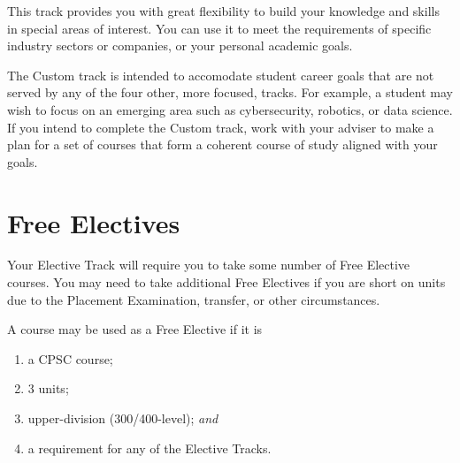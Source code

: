 \documentclass{book}
\begin{document}
This track provides you with great flexibility to build your knowledge and skills in special areas of interest. You can use it to meet the requirements of specific industry sectors or companies, or your personal academic goals.

The Custom track is intended to accomodate student career goals that are not served by any of the four other, more focused, tracks. For example, a student may wish to focus on an emerging area such as cybersecurity, robotics, or data science. If you intend to complete the Custom track, work with your adviser to make a plan for a set of courses that form a coherent course of study aligned with your goals.

\section{Free Electives}
\label{section:free_electives}

Your Elective Track will require you to take some number of Free Elective courses. You may need to take additional Free Electives if you are short on units due to the Placement Examination, transfer, or other circumstances.

A course may be used as a Free Elective if it is
\begin{enumerate}
\item a CPSC course;
\item 3 units;
\item upper-division (300/400-level); \emph{and}
\item a requirement for any of the Elective Tracks.
\end{enumerate}
\end{document}
